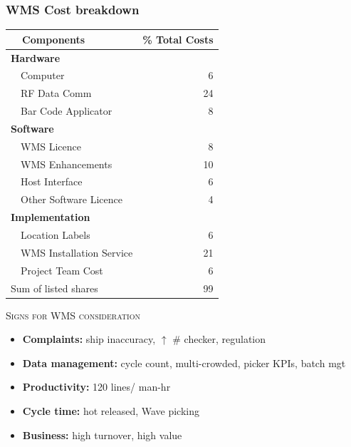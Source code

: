 \documentclass[10pt,handout,notes=show]{beamer}
\begin{document}
\begin{frame}
  \frametitle{WMS Cost breakdown}

          \begin{center}\scriptsize{
            \begin{tabular}{lr} \hline
              ~~Components          & \% Total Costs \\ \hline
              \multicolumn{2}{l}{\textbf{Hardware}} \\
              ~~Computer		        & 6 \\
              ~~RF Data Comm		    & 24 \\
              ~~Bar Code Applicator	& 8 \\
              \multicolumn{2}{l}{\textbf{Software}}  \\
              ~~WMS Licence	        & 8 \\
              ~~WMS Enhancements	  & 10 \\
              ~~Host Interface	    & 6\\
              ~~Other Software Licence	& 4\\
              \multicolumn{2}{l}{\textbf{Implementation}}  \\
              ~~Location Labels	    &6 \\
              ~~WMS Installation Service	& 21\\
              ~~Project Team Cost & 6 \\ \hline
              Sum of listed shares & 99 \\ \hline
          \end{tabular}}
        \end{center}

  \NextHalfLine
  \textsc{Signs for  WMS consideration}
  \begin{itemize}
    \item \textbf{Complaints:} ship inaccuracy, $\uparrow$ \# checker, regulation
    \item \textbf{Data management:} cycle count, multi-crowded, picker KPIs, batch mgt
    \item \textbf{Productivity:} 120 lines/ man-hr
    \item \textbf{Cycle time:} hot released, Wave picking
    \item \textbf{Business:} high turnover, high value
  \end{itemize}


\end{frame}
\end{document}
